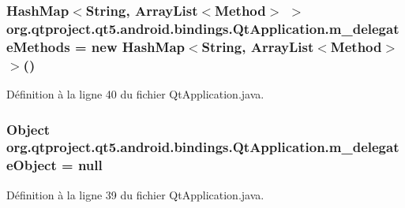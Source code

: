 \hypertarget{classorg_1_1qtproject_1_1qt5_1_1android_1_1bindings_1_1_qt_application_a5b32c9d8ce150fc1866812b13debbcfb}{
\subsubsection[{m\-\_\-delegate\-Methods}]{\setlength{\rightskip}{0pt plus 5cm}Hash\-Map$<$String, Array\-List$<$Method$>$ $>$ org.\-qtproject.\-qt5.\-android.\-bindings.\-Qt\-Application.\-m\-\_\-delegate\-Methods = new Hash\-Map$<$String, Array\-List$<$Method$>$$>$()\hspace{0.3cm}{\ttfamily [static]}}}\label{classorg_1_1qtproject_1_1qt5_1_1android_1_1bindings_1_1_qt_application_a5b32c9d8ce150fc1866812b13debbcfb}


Définition à la ligne 40 du fichier Qt\-Application.\-java.

\hypertarget{classorg_1_1qtproject_1_1qt5_1_1android_1_1bindings_1_1_qt_application_a8b778a94cf5468dfc07ae8f3e8d81148}{
\subsubsection[{m\-\_\-delegate\-Object}]{\setlength{\rightskip}{0pt plus 5cm}Object org.\-qtproject.\-qt5.\-android.\-bindings.\-Qt\-Application.\-m\-\_\-delegate\-Object = null\hspace{0.3cm}{\ttfamily [static]}}}\label{classorg_1_1qtproject_1_1qt5_1_1android_1_1bindings_1_1_qt_application_a8b778a94cf5468dfc07ae8f3e8d81148}


Définition à la ligne 39 du fichier Qt\-Application.\-java.

